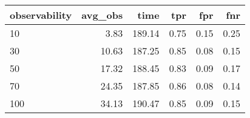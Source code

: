 \begin{tabular}{lrrrrr}
\toprule
observability & avg_obs & time & tpr & fpr & fnr \\
\midrule
10 & 3.83 & 189.14 & 0.75 & 0.15 & 0.25 \\
30 & 10.63 & 187.25 & 0.85 & 0.08 & 0.15 \\
50 & 17.32 & 188.45 & 0.83 & 0.09 & 0.17 \\
70 & 24.35 & 187.85 & 0.86 & 0.08 & 0.14 \\
100 & 34.13 & 190.47 & 0.85 & 0.09 & 0.15 \\
\bottomrule
\end{tabular}
